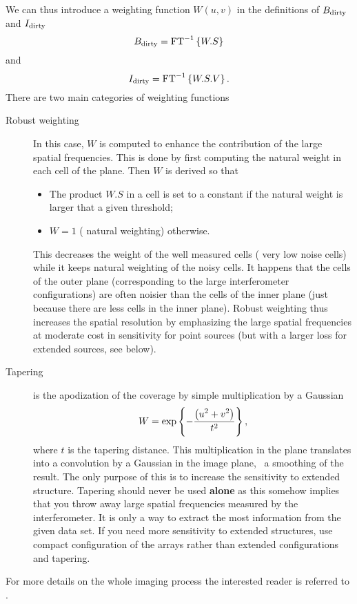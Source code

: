 We can thus introduce a weighting function $W(u,v)$ in the definitions of
$B_{\mathrm{dirty}}$ and $I_{\mathrm{dirty}}$
\begin{equation}
  B_{\mathrm{dirty}} = \mbox{FT}^{-1} \displaystyle\left\{ W.S \right\}
\end{equation}
and
\begin{equation}
  I_{\mathrm{dirty}} = \mbox{FT}^{-1} \displaystyle\left\{ W.S.V \right\}.
\end{equation}
There are two main categories of weighting functions
\begin{description}
\item[Robust weighting] In this case, $W$ is computed to enhance the
  contribution of the large spatial frequencies. This is done by first
  computing the natural weight in each cell of the \uv{} plane. Then $W$ is
  derived so that
  \begin{itemize}
  \item The product $W.S$ in a \uv{} cell is set to a constant if the
    natural weight is larger that a given threshold;
  \item $W = 1$ (\ie{} natural weighting) otherwise.
  \end{itemize}
  This decreases the weight of the well measured \uv{} cells (\ie{} very
  low noise cells) while it keeps natural weighting of the noisy cells.  It
  happens that the cells of the outer \uv{} plane (corresponding to the
  large interferometer configurations) are often noisier than the cells of
  the inner \uv{} plane (just because there are less cells in the inner
  \uv{} plane). Robust weighting thus increases the spatial resolution by
  emphasizing the large spatial frequencies at moderate cost in sensitivity 
  for point sources (but with a larger loss for extended sources, see below).
\item[Tapering] is the apodization of the \uv{} coverage by simple
  multiplication by a Gaussian
  \begin{equation}
    W = \exp\displaystyle\left\{ -\frac{\displaystyle\left( u^2+v^2 \right) }{t^2} \right\},
  \end{equation}
  where $t$ is the tapering distance. This multiplication in the \uv{}
  plane translates into a convolution by a Gaussian in the image plane,
  \ie\ a smoothing of the result. The only purpose of this is to increase
  the sensitivity to extended structure. Tapering should never be
  used \textbf{alone} as this somehow implies that you throw away large spatial
  frequencies measured by the interferometer. It is only a way to extract
  the most information from the given data set. If you need more sensitivity
  to extended structures, use compact configuration of the arrays 
  rather than extended configurations and tapering.
\end{description}
For more details on the whole imaging process the interested reader is
referred to \cite{guilloteau00}.

